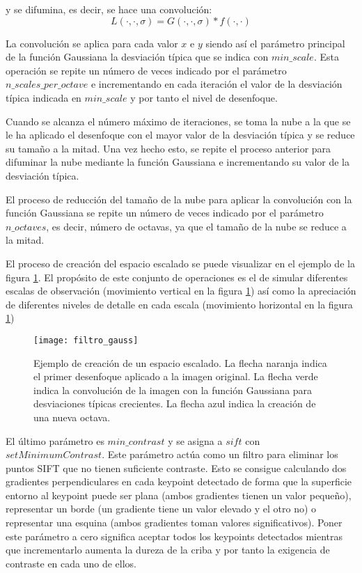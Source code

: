 y se difumina, es decir, se hace una convolución: 
$$L(\cdot,\cdot,\sigma)=G(\cdot,\cdot,\sigma)*f(\cdot,\cdot)$$

La convolución se aplica para cada valor $x$ e $y$ siendo así el parámetro principal de la función Gaussiana la desviación típica que se indica con $min\_scale$. Esta operación se repite un número de veces indicado por el parámetro $n\_scales\_per\_octave$ e incrementando en cada iteración el valor de la desviación típica indicada en $min\_scale$ y por tanto el nivel de desenfoque.

Cuando se alcanza el número máximo de iteraciones, se toma la nube a la que se le ha aplicado el desenfoque con el mayor valor de la desviación típica y se reduce su tamaño a la mitad. Una vez hecho esto, se repite el proceso anterior para difuminar la nube mediante la función Gaussiana e incrementando su valor de la desviación típica. 

El proceso de reducción del tamaño de la nube para aplicar la convolución con la función Gaussiana se repite un número de veces indicado por el parámetro $n\_octaves$, es decir, número de octavas, ya que el tamaño de la nube se reduce a la mitad.

El proceso de creación del espacio escalado se puede visualizar en el ejemplo de la figura \ref{fig:filtro_gauss}. El propósito de este conjunto de operaciones es el de simular diferentes escalas de observación (movimiento vertical en la figura \ref{fig:filtro_gauss}) así como la apreciación de diferentes niveles de detalle en cada escala (movimiento horizontal en la figura \ref{fig:filtro_gauss})  

\begin{figure}
\centering
\texttt{[image: filtro\_gauss]}
\caption{Ejemplo de creación de un espacio escalado. La flecha naranja indica el primer desenfoque aplicado a la imagen original. La flecha verde indica la convolución de la imagen con la función Gaussiana para desviaciones típicas crecientes. La flecha azul indica la creación de una nueva octava.}\label{fig:filtro_gauss}
\end{figure}




El último parámetro es $min\_contrast$ y se asigna a $sift$ con $setMinimumContrast$. Este parámetro actúa como un filtro para eliminar los puntos SIFT que no tienen suficiente contraste. Esto se consigue calculando dos gradientes perpendiculares en cada keypoint detectado de forma que la superficie entorno al keypoint puede ser plana (ambos gradientes tienen un valor pequeño), representar un borde (un gradiente tiene un valor elevado y el otro no) o representar una esquina (ambos gradientes toman valores significativos). Poner este parámetro a cero significa aceptar todos los keypoints detectados mientras que incrementarlo aumenta la dureza de la criba y por tanto la exigencia de contraste en cada uno de ellos.

